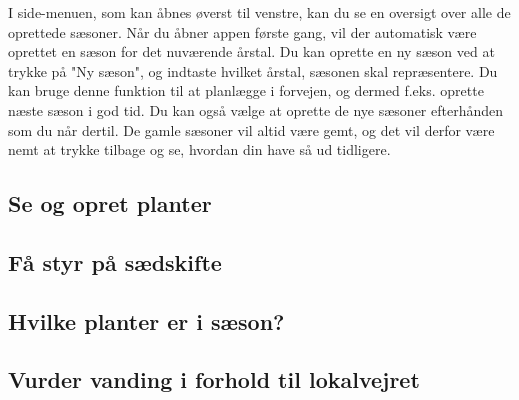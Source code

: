 \begin{minipage}{0.55\textwidth}
I side-menuen, som kan åbnes øverst til venstre, kan du se en oversigt over alle de oprettede sæsoner. Når du åbner appen første gang, vil der automatisk være oprettet en sæson for det nuværende årstal. Du kan oprette en ny sæson ved at trykke på "Ny sæson", og indtaste hvilket årstal, sæsonen skal repræsentere. Du kan bruge denne funktion til at planlægge i forvejen, og dermed f.eks. oprette næste sæson i god tid. Du kan også vælge at oprette de nye sæsoner efterhånden som du når dertil. De gamle sæsoner vil altid være gemt, og det vil derfor være nemt at trykke tilbage og se, hvordan din have så ud tidligere.
\end{minipage} 

\subsection{Se og opret planter}

\subsection{Få styr på sædskifte}

\subsection{Hvilke planter er i sæson?}

\subsection{Vurder vanding i forhold til lokalvejret}
